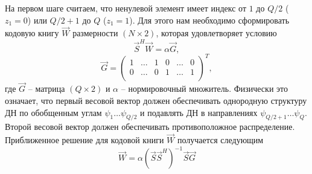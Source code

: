 На первом шаге считаем, что ненулевой элемент имеет индекс от $1$ до $Q/2$ ($z_1=0$) или
$Q/2+1$ до $Q$ ($z_1=1$). Для этого нам необходимо сформировать кодовую книгу $\vec W$ размерности $(N \times 2)$, которая удовлетворяет условию
\begin{equation}
    \label{eq:4.47}
    \vec S^H \vec W = \alpha \vec G,
\end{equation}
\begin{equation}
    \label{eq:4.48}
    \vec G =
    \begin{pmatrix}
        1 & \dots & 1 & 0 & \dots & 0 \\
        0 & \dots & 0 & 1 & \dots & 1 \\
    \end{pmatrix}^T,
\end{equation}
где $\vec G$ -- матрица $(Q \times 2)$ и $\alpha$ -- нормировочный множитель.
Физически это означает, что первый весовой вектор должен обеспечивать однородную структуру ДН по
обобщенным углам $\psi_1 \dots \psi_{Q/2}$ и подавлять ДН в направлениях $\psi_{Q/2 + 1}\dots \psi_Q$. Второй весовой вектор должен обеспечивать противоположное распределение.
Приближенное решение для кодовой книги $\vec W$ получается следующим
\begin{equation}
    \label{eq:4.49}
    \vec W = \alpha (\vec S \vec S^H)^{-1} \vec S \vec G
\end{equation}

